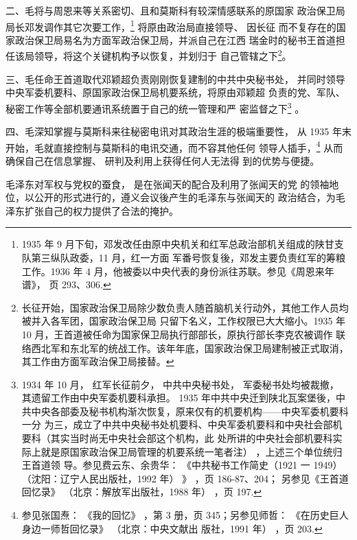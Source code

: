二、毛将与周恩来等关系密切、且和莫斯科有较深情感联系的原国家
政治保卫局局长邓发调作其它次要工作，\footnote{1935 年 9 月下旬，邓发改任由原中央机关和红军总政治部机关组成的陕甘支队第三纵队政委，11 月，红一方面
军番号恢复後，邓发主要负责红军的筹粮工作。1936 年 4
月，他被委以中央代表的身份派往苏联。参见《周恩来年谱》， 页 293、306. }
将原由政治局直接领导、
因长征
而不复存在的国家政治保卫局易名为方面军政治保卫局，并派自己在江西
瑞金时的秘书王首道担任该局领导，将这个关键机构予以恢复，并划归于
自己管辖之下\footnote{长征开始，国家政治保卫局除少数负责人随首脑机关行动外，其他工作人员均被并入各军团，国家政治保卫局
只留下名义，工作权限已大大缩小。1935 年 10 月，王首道被任命为国家保卫局执行部部长，原执行部长李克农被调作
联络西北军和东北军的统战工作。该年年底，国家政治保卫局建制被正式取消，其工作由方面军政治保卫局接替。}。

三、毛任命王首道取代邓颖超负责刚刚恢复建制的中共中央秘书处，
并同时领导中央军委机要科、原国家政治保卫局机要系统，将原由邓颖超
负责的党、军队、秘密工作等全部机要通讯系统置于自己的统一管理和严
密监督之下\footnote{1934 年 10 月，
红军长征前夕，
中共中央秘书处，
军委秘书处均被裁撤，
其遗留工作由中央军委机要科承担。
1935
年中共中央迁到陕北瓦案堡後，中共中央各部委及秘书机构渐次恢复，原来仅有的机要机构——中央军委机要科一分
为三，成立了中共中央秘书处机要科、中央军委机要科和中央社会部机要科（其实当时尚无中央社会部这个机构，此
处所讲的中央社会部机要科实际上就是原国家政治保卫局管理的机要系统一笔者注）
，上述三个单位统归王首道领
导。参见费云东、余贵华：
《中共秘书工作简史（1921 一 1949）（沈阳：辽宁人民出版社，1992 年）
》
，页 186-87、204；
另参见《王首道回忆录》
（北京：解放军出版社，1988 年） ，页 197.} 。

四、毛深知掌握与莫斯科来往秘密电讯对其政治生涯的极端重要性，
从 1935 年末开始，毛就直接控制与莫斯科的电讯交通，而不容其他任何
领导人插手，\footnote{参见张国焘：
《我的回忆》 ，第 3 册，页 345；另参见师哲：
《在历史巨人身边一师哲回忆录》
（北京：中央文献出
版社，1991 年）
，页 203.} 从而确保自己在信息掌握、
研判及利用上获得任何人无法得
到的优势与便捷。

毛泽东对军权与党权的蚕食，
是在张闻天的配合及利用了张闻天的党
的领袖地位，以公开的形式进行的，遵义会议後产生的毛泽东与张闻天的
政治结合，为毛泽东扩张自己的权力提供了合法的掩护。

